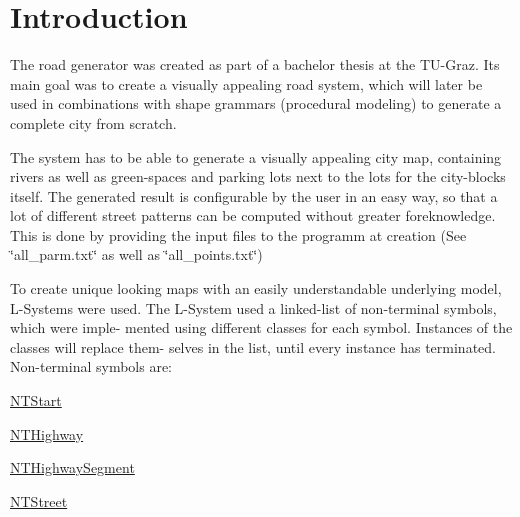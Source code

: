 \hypertarget{index_intro_sec}{}\section{Introduction}\label{index_intro_sec}
The road generator was created as part of a bachelor thesis at the T\+U-\/\+Graz. Its main goal was to create a visually appealing road system, which will later be used in combinations with shape grammars (procedural modeling) to generate a complete city from scratch.

The system has to be able to generate a visually appealing city map, containing rivers as well as green-\/spaces and parking lots next to the lots for the city-\/blocks itself. The generated result is configurable by the user in an easy way, so that a lot of different street patterns can be computed without greater foreknowledge. This is done by providing the input files to the programm at creation (See \char`\"{}all\+\_\+parm.\+txt\char`\"{} as well as \char`\"{}all\+\_\+points.\+txt\char`\"{})

To create unique looking maps with an easily understandable underlying model, L-\/\+Systems were used. The L-\/\+System used a linked-\/list of non-\/terminal symbols, which were imple-\/ mented using different classes for each symbol. Instances of the classes will replace them-\/ selves in the list, until every instance has terminated. Non-\/terminal symbols are\+:


\begin{DoxyItemize}
\item \hyperlink{class_n_t_start}{N\+T\+Start}
\item \hyperlink{class_n_t_highway}{N\+T\+Highway}
\item \hyperlink{class_n_t_highway_segment}{N\+T\+Highway\+Segment}
\item \hyperlink{class_n_t_street}{N\+T\+Street}
\end{DoxyItemize}

